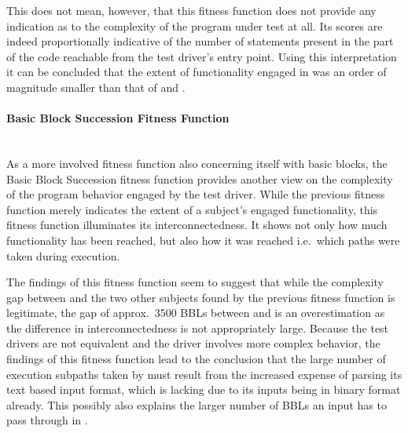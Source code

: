 This does not mean, however, that this fitness function does not provide any indication as to the complexity of
the program under test at all. Its scores are indeed proportionally indicative of the number of statements
present in the part of the code reachable from the test driver's entry point. Using this interpretation it can
be concluded that the extent of functionality engaged in \libpcap was an order of magnitude smaller than that
of \libpng and \libxml.

\paragraph{Basic Block Succession Fitness Function} ~\\
As a more involved fitness function also concerning itself with basic blocks, the Basic Block Succession
fitness function provides another view on the complexity of the program behavior engaged by the test driver.
While the previous fitness function merely indicates the extent of a subject's engaged functionality, this
fitness function illuminates its interconnectedness. It shows not only how much functionality has been reached,
but also how it was reached i.e.\ which paths were taken during execution.

The findings of this fitness function seem to suggest that while the complexity gap between \libpcap and the
two other subjects found by the previous fitness function is legitimate, the gap of approx.\ 3500 BBLs between
\libpng and \libxml is an overestimation as the difference in interconnectedness is not appropriately
large. Because the test drivers are not equivalent and the \libpng driver involves more complex
behavior, the findings of this fitness function lead to the conclusion that the large number of execution
subpaths taken by \libxml must result from the increased expense of parsing its text based input format, which
\libpng is lacking due to its inputs being in binary format already. This possibly also explains the larger
number of BBLs an input has to pass through in \libxml.


